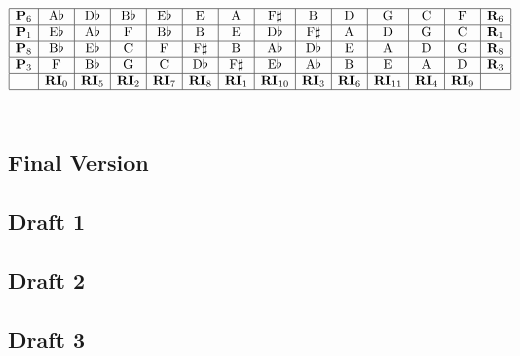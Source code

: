 \documentclass{article}
\newcommand\emptypage{
    \null
    \thispagestyle{empty}
    \newpage
    }
\begin{document}
\[\begin{array}{|c|c|c|c|c|c|c|c|c|c|c|c|c|c|}
\hline
\mathbf{P}_6&\mathrm{A}\flat&\mathrm{D}\flat&\mathrm{B}\flat&\mathrm{E}\flat&\mathrm{E}&\mathrm{A}&\mathrm{F}\sharp&\mathrm{B}&\mathrm{D}&\mathrm{G}&\mathrm{C}&\mathrm{F}&\mathbf{R}_6\\
\hline
\mathbf{P}_1&\mathrm{E}\flat&\mathrm{A}\flat&\mathrm{F}&\mathrm{B}\flat&\mathrm{B}&\mathrm{E}&\mathrm{D}\flat&\mathrm{F}\sharp&\mathrm{A}&\mathrm{D}&\mathrm{G}&\mathrm{C}&\mathbf{R}_1\\
\hline
\mathbf{P}_8&\mathrm{B}\flat&\mathrm{E}\flat&\mathrm{C}&\mathrm{F}&\mathrm{F}\sharp&\mathrm{B}&\mathrm{A}\flat&\mathrm{D}\flat&\mathrm{E}&\mathrm{A}&\mathrm{D}&\mathrm{G}&\mathbf{R}_8\\
\hline
\mathbf{P}_3&\mathrm{F}&\mathrm{B}\flat&\mathrm{G}&\mathrm{C}&\mathrm{D}\flat&\mathrm{F}\sharp&\mathrm{E}\flat&\mathrm{A}\flat&\mathrm{B}&\mathrm{E}&\mathrm{A}&\mathrm{D}&\mathbf{R}_3\\
\hline
&\mathbf{RI}_0&\mathbf{RI}_5&\mathbf{RI}_2&\mathbf{RI}_7&\mathbf{RI}_8&\mathbf{RI}_1&\mathbf{RI}_{10}&\mathbf{RI}_3&\mathbf{RI}_6&\mathbf{RI}_{11}&\mathbf{RI}_4&\mathbf{RI}_9&\\
\hline
\end{array}\]\\

\newpage
\begin{center}
\vspace*{\fill}
\LARGE
\subsection{Final Version}
\vspace*{\fill}
%
\end{center}

\newpage
\begin{center}
\vspace*{\fill}
\LARGE
\subsection{Draft 1}
\vspace*{\fill}
%
\end{center}
\newpage
\emptypage
\emptypage
\begin{center}
\vspace*{\fill}
\LARGE
\subsection{Draft 2}
\vspace*{\fill}
%
\end{center}
\newpage
\emptypage
\emptypage
\emptypage
\begin{center}
\vspace*{\fill}
\LARGE
\subsection{Draft 3}
\vspace*{\fill}
%
\end{center}
\newpage
\emptypage
\emptypage
\emptypage
\emptypage
\emptypage
\emptypage
\end{document}
